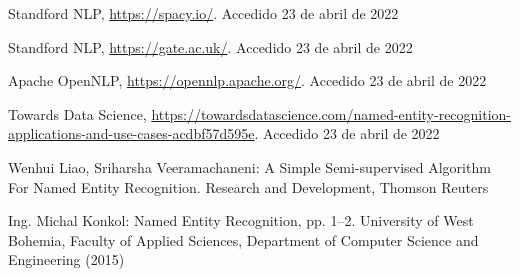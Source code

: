 \documentclass[runningheads]{llncs}
\begin{document}
\begin{thebibliography}{8}
Standford NLP, \url{https://spacy.io/}. Accedido 23 de abril de 2022

Standford NLP, \url{https://gate.ac.uk/}. Accedido 23 de abril de 2022

Apache OpenNLP, \url{https://opennlp.apache.org/}. Accedido 23 de abril de 2022

Towards Data Science, \url{https://towardsdatascience.com/named-entity-recognition-applications-and-use-cases-acdbf57d595e}. Accedido 23 de abril de 2022

Wenhui Liao, Sriharsha Veeramachaneni: A Simple Semi-supervised Algorithm For
Named Entity Recognition. Research and Development, Thomson Reuters

Ing. Michal Konkol: Named Entity Recognition, pp. 1--2. University of West Bohemia, Faculty of Applied Sciences, Department of Computer Science and Engineering (2015)


\end{thebibliography}
\end{document}
